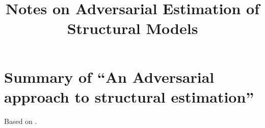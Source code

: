 



\title{Notes on Adversarial Estimation of Structural Models}
\date{}


\maketitle

\tableofcontents
\newpage

\section{Summary of ``An Adversarial approach to structural estimation''}

Based on \citet*[KMG]{kaji/manresa/guillaume:2022:adversarial_est}.




\newpage










